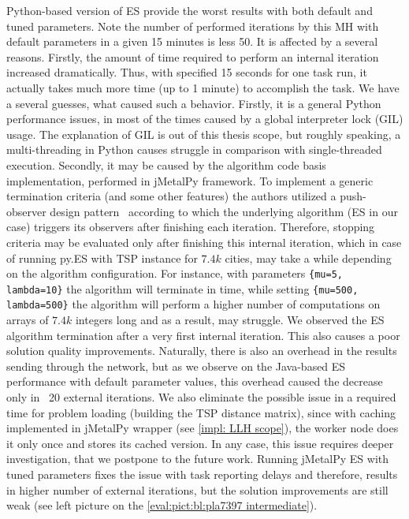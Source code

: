 Python-based version of ES provide the worst results with both default and tuned parameters. Note the number of performed iterations by this MH with default parameters in a given 15 minutes is less 50. It is affected by a several reasons. Firstly, the amount of time required to perform an internal iteration increased dramatically. Thus, with specified 15 seconds for one task run, it actually takes much more time (up to 1 minute) to accomplish the task. We have a several guesses, what caused such a behavior. Firstly, it is a general Python performance issues, in most of the times caused by a global interpreter lock (GIL) usage. The explanation of GIL is out of this thesis scope, but roughly speaking, a multi-threading in Python causes struggle in comparison with single-threaded execution. Secondly, it may be caused by the algorithm code basis implementation, performed in jMetalPy framework. To implement a generic termination criteria (and some other features) the authors utilized a push-observer design pattern~\cite{benitez2019jmetalpy} according to which the underlying algorithm (ES in our case) triggers its observers after finishing each iteration. Therefore, stopping criteria may be evaluated only after finishing this internal iteration, which in case of running py.ES with TSP instance for $7.4k$ cities, may take a while depending on the algorithm configuration. For instance, with parameters \texttt{\{mu=5, lambda=10\}} the algorithm will terminate in time, while setting \texttt{\{mu=500, lambda=500\}} the algorithm will perform a higher number of computations on arrays of $7.4k$ integers long and as a result, may struggle. We observed the ES algorithm termination after a very first internal iteration. This also causes a poor solution quality improvements. Naturally, there is also an overhead in the results sending through the network, but as we observe on the Java-based ES performance with default parameter values, this overhead caused the decrease only in ~20 external iterations. We also eliminate the possible issue in a required time for problem loading (building the TSP distance matrix), since with caching implemented in jMetalPy wrapper (see \cref{impl: LLH scope}), the worker node does it only once and stores its cached version. In any case, this issue requires deeper investigation, that we postpone to the future work. Running jMetalPy ES with tuned parameters fixes the issue with task reporting delays and therefore, results in higher number of external iterations, but the solution improvements are still weak (see left picture on the \cref{eval:pict:bl:pla7397 intermediate}).

